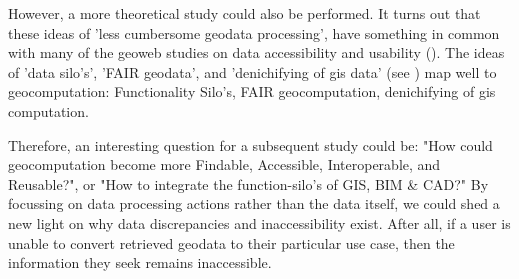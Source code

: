 However, a more theoretical study could also be performed. 
It turns out that these ideas of 'less cumbersome geodata processing', have something in common with many of the geoweb studies on data accessibility and usability (\cite{brink_geospatial_2018}).
The ideas of 'data silo's', 'FAIR geodata', and 'denichifying of \ac{gis} data' (see \cite{brink_geospatial_2018}) map well to geocomputation:
Functionality Silo's, FAIR geocomputation, denichifying of \ac{gis} computation. 

Therefore, an interesting question for a subsequent study could be: "How could geocomputation become more Findable, Accessible, Interoperable, and Reusable?", or "How to integrate the function-silo's of GIS, BIM \& CAD?"
By focussing on data processing actions rather than the data itself, we could shed a new light on why data discrepancies and inaccessibility exist. 
After all, if a user is unable to convert retrieved geodata to their particular use case, then the information they seek remains inaccessible.




  



